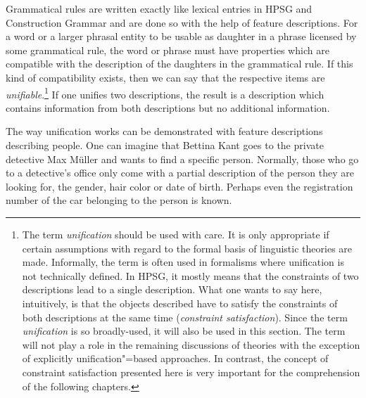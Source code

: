 \mbox{}%
Grammatical rules are written exactly like lexical entries in HPSG and Construction Grammar and are done so with the help of feature descriptions.
For a word or a larger phrasal entity to be usable as daughter in a phrase licensed by some
grammatical rule, the word or phrase must have properties which are compatible with the description of the daughters in the grammatical rule. If
this kind of compatibility exists, then we can say that the respective items are \emph{unifiable}.\footnote{
	The term \emph{unification} should be used with care. It is only appropriate if certain assumptions with regard to the formal basis
	of linguistic theories are made. Informally, the term is often used in formalisms where unification is not technically defined. In HPSG, it mostly means that
	the constraints of two descriptions lead to a single description. What one wants to say here, intuitively, is that the objects described have to
	satisfy the constraints of both descriptions at the same time (\emph{constraint satisfaction}). Since the term \emph{unification} is so broadly-used,
	it will also be used in this section. The term will not play a role in the remaining discussions of theories with the exception of
	explicitly unification"=based approaches. In contrast, the concept of constraint satisfaction presented here is very important for the comprehension
	of the following chapters.%
}
If one unifies two descriptions, the result is a description which contains information from both descriptions but no additional information.

The way unification works can be demonstrated with feature descriptions describing people. One can imagine that Bettina Kant goes to the private detective
Max Müller and wants to find a specific person. Normally, those who go to a detective's office only come with a partial description of the person they
are looking for, \eg the gender, hair color or date of birth. Perhaps even the registration number of the car belonging to the person is known.

